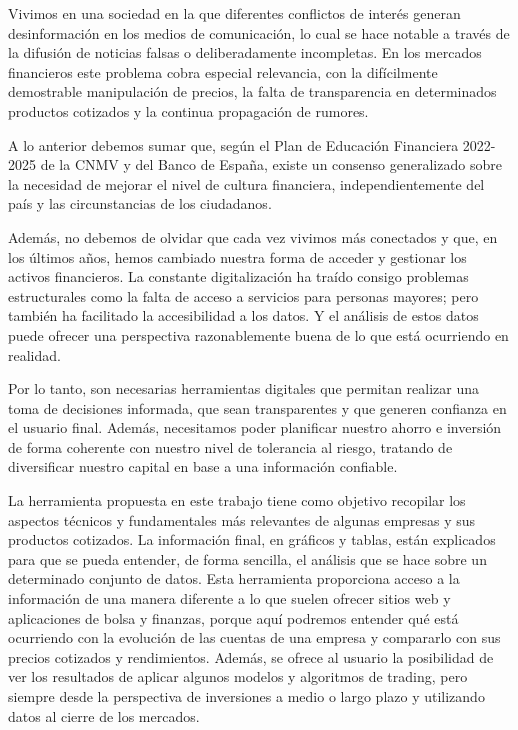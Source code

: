 
Vivimos en una sociedad en la que diferentes conflictos de interés generan desinformación en los medios de comunicación, lo cual se hace notable a través de la difusión de noticias falsas o deliberadamente incompletas. En los mercados financieros este problema cobra especial relevancia, con la difícilmente demostrable manipulación de precios, la falta de transparencia en determinados productos cotizados y la continua propagación de rumores. 

A lo anterior debemos sumar que, según el Plan de Educación Financiera 2022-2025\citep{cnmv-informe} de la CNMV\citep{cnmv-portal} y del Banco de España\citep{bde}, existe un consenso generalizado sobre la necesidad de mejorar el nivel de cultura financiera, independientemente del país y las circunstancias de los ciudadanos. 

Además, no debemos de olvidar que cada vez vivimos más conectados y que, en los últimos años, hemos cambiado nuestra forma de acceder y gestionar los activos financieros. La constante digitalización ha traído consigo problemas estructurales como la falta de acceso a servicios para personas mayores; pero también ha facilitado la accesibilidad a los datos. Y el análisis de estos datos puede ofrecer una perspectiva razonablemente buena de lo que está ocurriendo en realidad. 

Por lo tanto, son necesarias herramientas digitales que permitan realizar una toma de decisiones informada, que sean transparentes y que generen confianza en el usuario final. Además, necesitamos poder planificar nuestro ahorro e inversión de forma coherente con nuestro nivel de tolerancia al riesgo, tratando de diversificar nuestro capital en base a una información confiable. 

La herramienta propuesta en este trabajo tiene como objetivo recopilar los aspectos técnicos y fundamentales más relevantes de algunas empresas y sus productos cotizados. La información final, en gráficos y tablas, están explicados para que se pueda entender, de forma sencilla, el análisis que se hace sobre un determinado conjunto de datos. Esta herramienta proporciona acceso a la información de una manera diferente a lo que suelen ofrecer sitios web y aplicaciones de bolsa y finanzas, porque aquí podremos entender qué está ocurriendo con la evolución de las cuentas de una empresa y compararlo con sus precios cotizados y rendimientos. Además, se ofrece al usuario la posibilidad de ver los resultados de aplicar algunos modelos y algoritmos de trading, pero siempre desde la perspectiva de inversiones a medio o largo plazo y utilizando datos al cierre de los mercados. 



